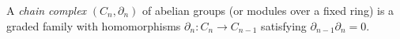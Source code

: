
A \emph{chain complex} $(C_n,\partial_n)$ of abelian groups (or modules over a fixed ring) is a graded family with homomorphisms $\partial_n:C_n\to C_{n-1}$ satisfying $\partial_{n-1}\partial_n=0$.
